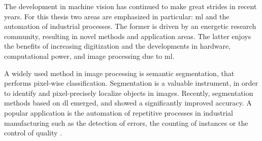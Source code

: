 


The development in machine vision has continued to make great strides in recent years. 
For this thesis two areas are emphasized in particular: \gls{ml} and the automation of industrial processes.
The former is driven by an energetic research community, resulting in novel methods and application areas.
The latter enjoys the benefits of increasing digitization and the developments in hardware, computational power, and image processing due to \gls{ml}.


A widely used method in image processing is semantic segmentation, that performs pixel-wise classification.
Segmentation is a valuable instrument, in order to identify and pixel-precisely localize objects in images.
Recently, segmentation methods based on \gls{dl} emerged, and showed a significantly improved accuracy.
A popular application is the automation of repetitive processes in industrial manufacturing such as the detection of errors, the counting of instances or the control of quality \cite{Rah19-IoT} \cite{Chen19-AnomalyDetectionManufacturing}.

